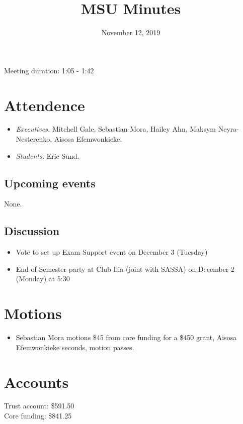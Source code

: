 \documentclass[12pt]{article}
\title{MSU Minutes}
\date{November 12, 2019}
\begin{document}
\maketitle

Meeting duration: 1:05 - 1:42

\section*{Attendence}
\begin{itemize}
\item \textit{Executives.} Mitchell Gale, Sebastian Mora, Hailey Ahn, Maksym Neyra-Nesterenko, Aisosa Efemwonkieke.
\item \textit{Students.} Eric Sund.
\end{itemize}

\subsection*{Upcoming events}
None.

\subsection*{Discussion}
\begin{itemize}
\item Vote to set up Exam Support event on December 3 (Tuesday)
\item End-of-Semester party at Club Ilia (joint with SASSA) on December 2 (Monday) at 5:30
\end{itemize}

\section*{Motions}
\begin{itemize}
\item Sebastian Mora motions \$45 from core funding for a \$450 grant, Aisosa Efemwonkieke seconds, motion passes.
\end{itemize}

\section*{Accounts}

Trust account: \$591.50 \\
Core funding: \$841.25 \\
\end{document}
